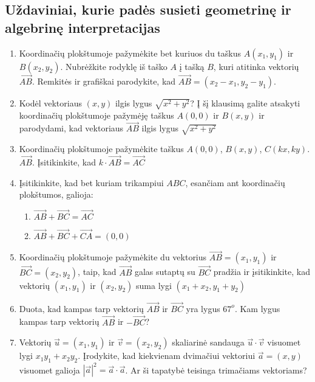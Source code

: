 \documentclass[a4paper]{article}
\begin{document}
\subsection{Uždaviniai, kurie padės susieti geometrinę ir algebrinę interpretacijas}

\begin{enumerate}
\item Koordinačių plokštumoje pažymėkite bet kuriuos du taškus $A(x_1,y_1)$ ir $B(x_2, y_2)$. Nubrėžkite rodyklę iš taško $A$ į tašką $B$, kuri atitinka vektorių $\overrightarrow{AB}$. Remkitės  ir grafiškai parodykite, kad $\overrightarrow{AB}=(x_2-x_1, y_2-y_1)$.
\item Kodėl vektoriaus $(x,y)$ ilgis lygus $\sqrt{x^2+y^2}$? Į šį klausimą galite atsakyti koordinačių plokštumoje pažymėję taškus $A(0,0)$ ir $B(x, y)$ ir parodydami, kad vektoriaus $\overrightarrow{AB}$ ilgis lygus $\sqrt{x^2+y^2}$
\item Koordinačių plokštumoje pažymėkite taškus $A(0,0)$, $B(x, y)$, $C(kx, ky)$. $\overrightarrow{AB}$. Įsitikinkite, kad $k\cdot \overrightarrow{AB}=\overrightarrow{AC}$
\item Įsitikinkite, kad bet kuriam trikampiui $ABC$, esančiam ant koordinačių plokštumos, galioja: 
\begin{enumerate}
\item $\overrightarrow{AB}+\overrightarrow{BC}=\overrightarrow{AC}$
\item $\overrightarrow{AB}+\overrightarrow{BC}+\overrightarrow{CA}=(0, 0)$
\end{enumerate}
\item Koordinačių plokštumoje pažymėkite du vektorius $\overrightarrow{AB}=(x_1, y_1)$ ir $\overrightarrow{BC}=(x_2, y_2)$, taip, kad $\overrightarrow{AB}$ galas sutaptų su $\overrightarrow{BC}$ pradžia ir įsitikinkite, kad vektorių $(x_1, y_1)$ ir $(x_2, y_2)$ suma lygi $(x_1+x_2, y_1+y_2)$
\item Duota, kad kampas tarp vektorių $\overrightarrow{AB}$ ir $\overrightarrow{BC}$ yra lygus $67^o$. Kam lygus kampas tarp vektorių $\overrightarrow{AB}$ ir $-\overrightarrow{BC}$?
\item Vektorių $\overrightarrow{u}=(x_1, y_1)$ ir $\overrightarrow{v}=(x_2, y_2)$ skaliarinė sandauga $\overrightarrow{u}\cdot \overrightarrow{v}$ visuomet lygi $x_1y_1+x_2y_2$. Įrodykite, kad kiekvienam dvimačiui vektoriui $\overrightarrow{a}=(x, y)$ visuomet galioja $|\overrightarrow{a}|^2=\overrightarrow{a}\cdot \overrightarrow{a}$. Ar ši tapatybė teisinga trimačiams vektoriams?
\end{enumerate}
\end{document}
